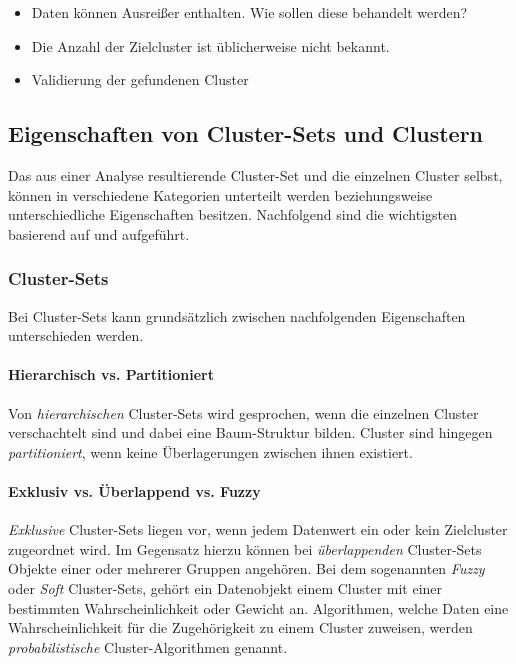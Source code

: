 \begin{itemize}
    \item Daten können Ausreißer enthalten. Wie sollen diese behandelt werden?
    \item Die Anzahl der Zielcluster ist üblicherweise nicht bekannt.
    \item Validierung der gefundenen Cluster
\end{itemize}

\subsection{Eigenschaften von Cluster-Sets und Clustern}

Das aus einer Analyse resultierende Cluster-Set und die einzelnen Cluster selbst,
können in verschiedene Kategorien unterteilt werden beziehungsweise unterschiedliche Eigenschaften besitzen.
Nachfolgend sind die wichtigsten basierend auf \cite[]{tan2007introduction} und \cite[]{Jain1999,Jain2010} aufgeführt.

\subsubsection{Cluster-Sets}

Bei Cluster-Sets kann grundsätzlich zwischen nachfolgenden Eigenschaften unterschieden werden.

\paragraph{Hierarchisch vs. Partitioniert}
Von \textit{hierarchischen} Cluster-Sets wird gesprochen, wenn die einzelnen Cluster verschachtelt sind und dabei eine
Baum-Struktur bilden. Cluster sind hingegen \textit{partitioniert}, wenn keine Überlagerungen zwischen ihnen existiert.

\paragraph{Exklusiv vs. Überlappend vs. Fuzzy}
\textit{Exklusive} Cluster-Sets liegen vor, wenn jedem Datenwert ein oder kein Zielcluster zugeordnet wird.
Im Gegensatz hierzu können bei \textit{überlappenden} Cluster-Sets Objekte einer oder mehrerer Gruppen angehören.
Bei dem sogenannten \textit{Fuzzy} oder \textit{Soft} Cluster-Sets, gehört ein Datenobjekt einem Cluster
mit einer bestimmten Wahrscheinlichkeit oder Gewicht an. Algorithmen, welche Daten eine
Wahrscheinlichkeit für die Zugehörigkeit zu einem Cluster zuweisen, werden \textit{probabilistische}
Cluster-Algorithmen genannt.

